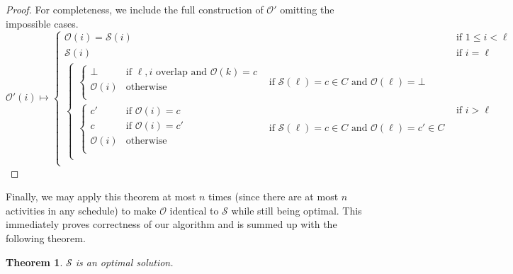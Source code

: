 \documentclass{article}
\theoremstyle{plain}%
\newtheorem{thm}{Theorem}[section]
\theoremstyle{definition}
\theoremstyle{remark}
\begin{document}
\begin{proof}
    For completeness, we include the full construction of $\mathcal{O}'$ omitting the impossible cases.
    \begin{equation}
        \mathcal{O}'(i) \mapsto
            \begin{cases}
                \mathcal{O}(i) = \mathcal{S}(i) & \text{if $1 \le i < \ell$} \\
                \mathcal{S}(i) & \text{if $i = \ell$} \\
                \begin{cases} 
                    \begin{cases} 
                        \bot & \text{if $\ell,i$ overlap and $\mathcal{O}(k) = c$} \\
                        \mathcal{O}(i) & \text{otherwise} \\
                    \end{cases} 
                            & \text{if $\mathcal{S}(\ell) = c \in C$ and $\mathcal{O}(\ell) =\bot$} \\
                    \begin{cases} 
                        c' & \text{if $\mathcal{O}(i) = c$} \\
                        c & \text{if $\mathcal{O}(i) = c'$} \\
                        \mathcal{O}(i) & \text{otherwise} \\
                    \end{cases} 
                            & \text{if $\mathcal{S}(\ell) = c \in C$ and $\mathcal{O}(\ell) =c' \in C$} \\
                \end{cases} 
                    & \text{if $i > \ell$} \\
            \end{cases}
    \end{equation}
\end{proof}
Finally, we may apply this theorem at most $n$ times (since there are at most
    $n$ activities in any schedule) to make $\mathcal{O}$ 
    identical to $\mathcal{S}$ while still being optimal.
This immediately proves correctness of our algorithm and is summed up with the
    following theorem.
\begin{thm}
    $\mathcal{S}$ is an optimal solution.
\end{thm}
\end{document}
